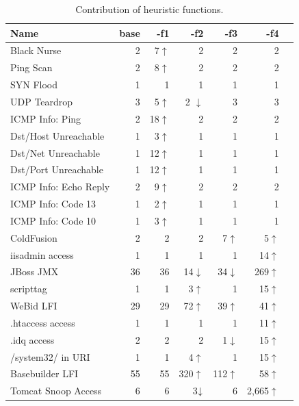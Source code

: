 \documentclass[conference]{IEEEtran}
\begin{document}
\begin{table}[t!]
  \footnotesize
  \setlength{\tabcolsep}{8pt}
  \renewcommand{\arraystretch}{-0.01}
  \caption{\label{table:weights}Contribution of heuristic functions.}
  \vspace{-2ex}
  \centering
  \begin{tabular}{lrrrrrr}
    \toprule
    Name &
    base &
    -f1 &
    -f2 &    
    -f3 &
    -f4 \\
    \midrule
    Black Nurse & 2 & 7$\uparrow$ & 2 & 2 & 2 \\    
    Ping Scan & 2 &  8$\uparrow$& 2 & 2 & 2 \\
    SYN Flood & 1 & 1 & 1 & 1 & 1 \\
      UDP Teardrop & 3 & 5$\uparrow$ & 2 \cellcolor{lightgray}$\downarrow$ & 3 & 3 \\
    ICMP Info: Ping & 2 & 18$\uparrow$& 2 & 2 & 2 \\
    Dst/Host Unreachable & 1 & 3$\uparrow$ & 1 & 1 & 1 \\
    Dst/Net Unreachable & 1 & 12$\uparrow$ & 1 & 1 & 1 \\
    Dst/Port Unreachable & 1 & 12$\uparrow$ & 1 & 1 & 1 \\
    ICMP Info: Echo Reply & 2 & 9$\uparrow$ & 2 & 2 & 2 \\
    ICMP Info: Code 13 & 1 & 2$\uparrow$ & 1 & 1 & 1 \\
    ICMP Info: Code 10 & 1 & 3$\uparrow$ & 1 & 1 & 1 \\
    \midrule
    ColdFusion & 2 & 2 & 2 & 7$\uparrow$ & 5$\uparrow$ \\
    iisadmin access & 1  & 1 & 1 & 1 & 14$\uparrow$\\        
    JBoss JMX & 36 & 36 & 14\cellcolor{lightgray}$\downarrow$ & 34\cellcolor{lightgray}$\downarrow$ & 269$\uparrow$ \\
    scripttag & 1 & 1 & 3$\uparrow$ & 1 & 15$\uparrow$ \\
    WeBid LFI & 29 & 29 & 72$\uparrow$ & 39$\uparrow$ & 41$\uparrow$ \\    
    .htaccess access & 1  & 1 & 1 & 1 & 11$\uparrow$\\
    .idq access & 2  & 2 & 2 & 1\cellcolor{lightgray}$\downarrow$ & 15$\uparrow$ \\
    /system32/ in URI & 1  & 1 & 4$\uparrow$ & 1 & 15$\uparrow$\\
    Basebuilder LFI & 55  & 55 & 320$\uparrow$ & 112$\uparrow$ & 58$\uparrow$\\
      Tomcat Snoop Access & 6 & 6 & 3$\cellcolor{lightgray}\downarrow$ & 6 & 2,665$\uparrow$\\
    \bottomrule
  \end{tabular}
\end{table}
\end{document}
